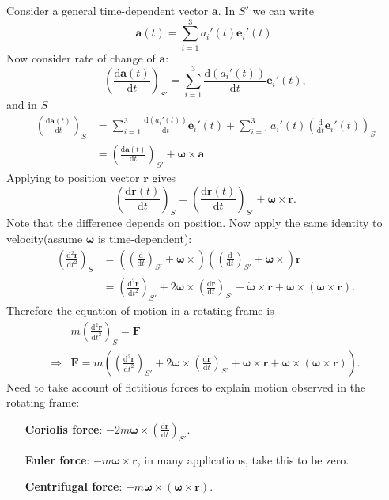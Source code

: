Consider a general time-dependent vector $ \mathbf{a} $. In $ S' $ we can write
\[
    \mathbf{a}(t) = \sum_{i=1}^{3} a_i'(t)\mathbf{e}_i'(t).
\]
Now consider rate of change of $ \mathbf{a} $:
\[
    \left( \frac{\mathrm{d}\mathbf{a}(t)}{\mathrm{d}t}  \right)_{S'} = \sum_{i=1}^{3}\frac{\mathrm{d}(a_i'(t))}{\mathrm{d}t}\mathbf{e}_i'(t) ,
\] 
and in $S$ 
\begin{align*}
    \left( \frac{\mathrm{d}\mathbf{a}(t)}{\mathrm{d}t} \right)_S 
    &= \sum_{i=1}^{3}\frac{\mathrm{d}(a_i'(t))}{\mathrm{d}t}\mathbf{e}_i'(t) + \sum_{i=1}^{3} a_i'(t) \left( \frac{\mathrm{d}}{\mathrm{d}t}\mathbf{e}_i'(t) \right)_S \\ 
    &= \left( \frac{\mathrm{d}\mathbf{a}(t)}{\mathrm{d}t}  \right)_{S'}+\boldsymbol{\omega} \times \mathbf{a}.
\end{align*}
Applying to position vector $\mathbf{r}$  gives
\[
    \left( \frac{\mathrm{d}\mathbf{r}(t)}{\mathrm{d}t} \right)_S=\left( \frac{\mathrm{d}\mathbf{r}(t)}{\mathrm{d}t}  \right)_{S'}+\boldsymbol{\omega}\times \mathbf{r}.
\]
Note that the difference depends on position. Now apply the same identity to velocity(assume $ \boldsymbol{\omega} $ is time-dependent):
\begin{align*}
    \left( \frac{\mathrm{d}^2\mathbf{r}}{\mathrm{d}t^2}  \right)_S &= \left( \left( \frac{\mathrm{d}}{\mathrm{d}t}  \right)_{S'}+\boldsymbol{\omega}\times  \right)\left( \left( \frac{\mathrm{d}}{\mathrm{d}t}  \right)_{S'}+\boldsymbol{\omega}\times  \right)\mathbf{r}\\ 
    &=\left( \frac{\mathrm{d}^2\mathbf{r}}{\mathrm{d}t^2}  \right)_{S'}+2 \boldsymbol{\omega}\times \left( \frac{\mathrm{d}\mathbf{r}}{\mathrm{d}t}  \right)_{S'}+\dot{\boldsymbol{\omega}}\times \mathbf{r}+\boldsymbol{\omega} \times (\boldsymbol{\omega} \times \mathbf{r}).
\end{align*}
Therefore the equation of motion in a rotating frame is 
\begin{align*}
    &m \left( \frac{\mathrm{d}^2\mathbf{r}}{\mathrm{d}t^2}  \right)_S =\mathbf{F}\\ 
    \Longrightarrow &\mathbf{F}= m\left( \left( \frac{\mathrm{d}^2\mathbf{r}}{\mathrm{d}t^2}  \right)_{S'}+2 \boldsymbol{\omega}\times \left( \frac{\mathrm{d}\mathbf{r}}{\mathrm{d}t}  \right)_{S'}+\dot{\boldsymbol{\omega}}\times \mathbf{r}+\boldsymbol{\omega} \times (\boldsymbol{\omega} \times \mathbf{r}) \right).
\end{align*}
Need to take account of fictitious forces to explain motion observed in the rotating frame:
\begin{enumerate}[align=left]
    \item[\textbf{Coriolis force}:] $\displaystyle -2m\boldsymbol{\omega}\times \left( \frac{\mathrm{d}\mathbf{r}}{\mathrm{d}t}  \right)_{S'}$.
    \item[\textbf{Euler force}:] $\displaystyle -m\dot{\boldsymbol{\omega}}\times \mathbf{r}$, in many applications, take this to be zero.
    \item[\textbf{Centrifugal force}:] $\displaystyle -m\boldsymbol{\omega} \times (\boldsymbol{\omega} \times \mathbf{r})$.
\end{enumerate}

